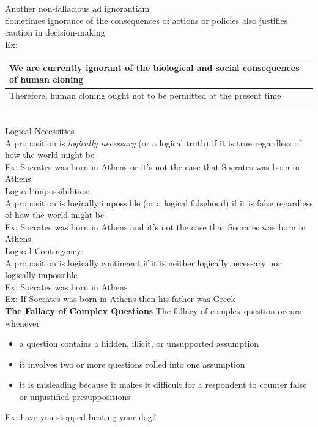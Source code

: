 \documentclass[11pt, fleqn]{article}
\begin{document}
Another non-fallacious ad ignorantiam\\
Sometimes ignorance of the consequences of actions or policies also justifies caution in decision-making\\
Ex:\\
\begin{tabular}{p{16cm}}
    We are currently ignorant of the biological and social consequences of human cloning\\
    \hline
    Therefore, human cloning ought not to be permitted at the present time
\end{tabular}\\

Logical Necessities\\
A proposition is \textit{logically necessary} (or a logical truth) if it is true regardless of how the world might be\\
Ex: Socrates was born in Athens or it's not the case that Socrates was born in Athens\\

Logical impossibilities:\\
A proposition is logically impossible (or a logical falsehood) if it is false regardless of how the world might be\\
Ex: Socrates was born in Athens and it's not the case that Socrates was born in Athens\\

Logical Contingency:\\
A proposition is logically contingent if it is neither logically necessary nor logically impossible\\
Ex: Socrates was born in Athens\\
Ex: If Socrates was born in Athens then his father was Greek\\

\textbf{The Fallacy of Complex Questions}
The fallacy of complex question occurs whenever
\begin{itemize}
    \item a question contains a hidden, illicit, or unsupported assumption
    \item it involves two or more questions rolled into one assumption
    \item it is misleading because it makes it difficult for a respondent to counter false or unjustified presuppositions
\end{itemize}
Ex: have you stopped beating your dog?\\
\end{document}
